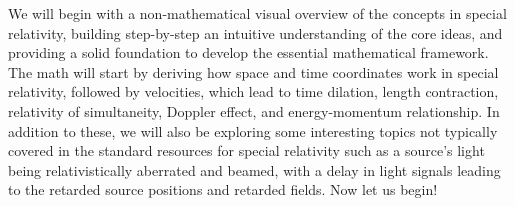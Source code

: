 We will begin with a non-mathematical visual overview of the concepts in special relativity, building step-by-step an intuitive understanding of the core ideas, and providing a solid foundation to develop the essential mathematical framework. The math will start by deriving how space and time coordinates work in special relativity, followed by velocities, which lead to time dilation, length contraction, relativity of simultaneity, Doppler effect, and energy-momentum relationship. In addition to these, we will also be exploring some interesting topics not typically covered in the standard resources for special relativity such as a source's light being relativistically aberrated and beamed, with a delay in light signals leading to the retarded source positions and retarded fields.
\vspace{1cm} \newline
Now let us begin!


\newpage
